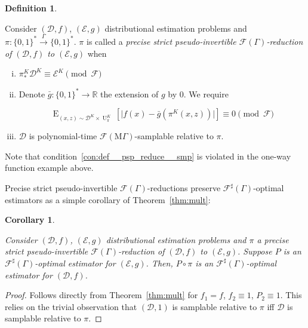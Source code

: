 \documentclass{article}
\numberwithin{equation}{section}
\theoremstyle{definition}
\newtheorem{definition}{Definition}[section]
\theoremstyle{plain}
\newtheorem{corollary}{Corollary}[section]
\newcommand{\Bool}{\{0,1\}}
\newcommand{\Words}{{\Bool^*}}
\DeclareMathOperator{\E}{E}
\DeclareMathOperator{\Un}{U}
\newcommand{\Reals}{\mathbb{R}}
\newcommand{\Abs}[1]{\lvert #1 \rvert}
\newcommand{\Dist}{\mathcal{D}}
\newcommand{\MGrow}{\mathrm{M}\Gamma}
\newcommand{\Fall}{\mathcal{F}}
\newcommand{\EG}{\Fall(\Gamma)}
\newcommand{\ESG}{\Fall^\sharp(\Gamma)}
\newcommand{\EMG}{\Fall(\MGrow)}
\newcommand{\Scheme}{\xrightarrow{\Gamma}}
\begin{document}
\begin{samepage}
\begin{definition}
\label{def:psp_reduce}

Consider $(\Dist,f)$, $(\mathcal{E},g)$ distributional estimation problems and ${\pi: \Words \Scheme \Words}$. $\pi$ is called a \emph{precise strict pseudo-invertible $\EG$-reduction of $(\Dist,f)$ to $(\mathcal{E},g)$} when

\begin{enumerate}[(i)]

\item\label{con:def__psp_reduce__dist} $\pi_*^K\Dist^{K} \equiv \mathcal{E}^{K} \pmod \Fall$

\item\label{con:def__psp_reduce__fun} Denote ${\bar{g}: \Words \rightarrow \Reals}$ the extension of $g$ by 0. We require

\[\E_{(x,z) \sim \Dist^{K} \times \Un_\pi^{K}}[\Abs{f(x)-\bar{g}(\pi^{K}(x,z))}] \equiv 0 \pmod \Fall\]

\item\label{con:def__psp_reduce__smp} $\Dist$ is polynomial-time $\EMG$-samplable relative to $\pi$.

\end{enumerate}

\end{definition}
\end{samepage}

Note that condition~\ref{con:def__psp_reduce__smp} is violated in the one-way function example above.

Precise strict pseudo-invertible $\EG$-reductions preserve $\ESG$-optimal estimators as a simple corollary of Theorem~\ref{thm:mult}:

\begin{samepage}
\begin{corollary}
\label{crl:psp_reduce_sharp}

Consider $(\Dist,f)$, $(\mathcal{E},g)$ distributional estimation problems and $\pi$ a precise strict pseudo-invertible $\EG$-reduction of $(\Dist, f)$ to $(\mathcal{E}, g)$. Suppose $P$ is an $\ESG$-optimal estimator for $(\mathcal{E}, g)$. Then, $P \circ \pi$ is an $\ESG$-optimal estimator for $(\Dist, f)$.

\end{corollary}
\end{samepage}

\begin{proof}

Follows directly from Theorem~\ref{thm:mult} for $f_1 = f$, ${f_2 \equiv 1}$, $P_2 \equiv 1$. This relies on the trivial observation that $(\Dist, 1)$ is samplable relative to $\pi$ iff $\Dist$ is samplable relative to $\pi$.
%
\end{proof}
\end{document}
